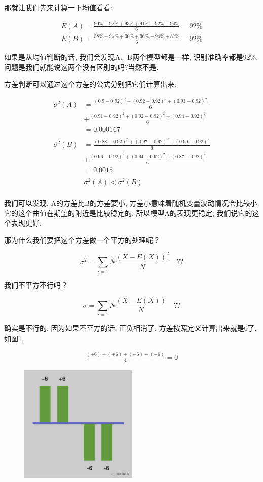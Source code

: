 那就让我们先来计算一下均值看看: 

\begin{align*}
  E(A) = \frac{90\% + 92\% + 93\% + 91\% + 92\% + 94\%}{6} = 92\% \\
  E(B) = \frac{88\% + 97\% + 90\% + 96\% + 94\% + 87\%}{6} = 92\% 
\end{align*}

如果是从均值判断的话, 我们会发现A、B两个模型都是一样, 识别准确率都是92\%. 问题是我们就能说这两个没有区别的吗?当然不是. 

方差判断可以通过这个方差的公式分别把它们计算出来: 

\begin{align*}
  \sigma^2(A) & = \frac{(0.9-0.92)^2+(0.92-0.92)^2+(0.93-0.92)^2}{6} \\ & + \frac{(0.91-0.92)^2+(0.92-0.92)^2+(0.94-0.92)^2}{6} \\ & = 0.000167 \\ \\
  \sigma^2(B) & = \frac{(0.88-0.92)^2+(0.97-0.92)^2+(0.90-0.92)^2}{6} \\ & + \frac{(0.96-0.92)^2+(0.94-0.92)^2+(0.87-0.92)^2}{6} \\ & = 0.0015 \\ \\
  & \sigma^2(A) < \sigma^2(B) \\
\end{align*}

我们可以发现, A的方差比B的方差要小, 方差小意味着随机变量波动情况会比较小, 它的这个曲值在期望的附近是比较稳定的. 所以模型A的表现更稳定, 我们说它的这个表现更好. 

那为什么我们要把这个方差做一个平方的处理呢？

\[
  \sigma ^2= \sum_{i=1}{N}\frac{(X-E(X))^2}{N} \quad ??
\]

我们不平方不行吗？

\[
  \sigma = \sum_{i=1}{N}\frac{(X-E(X))}{N}\quad ??
\]

确实是不行的, 因为如果不平方的话, 正负相消了, 方差按照定义计算出来就是0了, 如图\ref{fig:img22_2}. 

\begin{align*}
  \frac{(+6)+(+6)+(-6)+(-6)}{4} = 0
\end{align*}

\begin{figure}[ht]
  \centering
  \includegraphics[width=0.5\textwidth]{asset/snap2023-12-29_02.10.20.png}
  \caption{}
  \label{fig:img22_2}
\end{figure}

